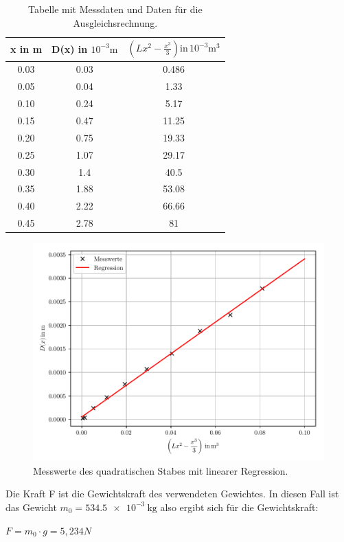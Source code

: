 \begin{table}
  \centering
  \caption{Tabelle mit Messdaten und Daten für die Ausgleichsrechnung.}
  \begin{tabular}{c c c}
    \toprule
    x in \si{\meter} & D(x) in $10^{-3}\si{\meter}$ & $\left(Lx^2-\frac{x^3}{3}\right) \text{in} \, 10^{-3}\si{\meter\tothe{3}}$ \\
    \midrule
    0.03 & 0.03 &  0.486 \\
    0.05 & 0.04 &  1.33 \\
    0.10 & 0.24 &  5.17 \\
    0.15 & 0.47 &  11.25 \\
    0.20 & 0.75 &  19.33 \\
    0.25 & 1.07 &  29.17 \\
    0.30 & 1.4 &  40.5 \\
    0.35 & 1.88 &  53.08 \\
    0.40 & 2.22 &  66.66 \\
    0.45 & 2.78 &  81 \\
    \bottomrule
  \end{tabular}
\end{table}

\begin{figure}[H]
  \centering
  \includegraphics[width=\textwidth]{ausgleichsgerade1.pdf}
  \caption{Messwerte des quadratischen Stabes mit linearer Regression.}
\end{figure}

Die Kraft F ist die Gewichtskraft des verwendeten Gewichtes. In diesen Fall ist das Gewicht
$m_0 = \SI{534.5e-3}{\kilo\gram}$ also ergibt sich für die Gewichtskraft:\\
\centerline{$F = m_0 \cdot g = 5,234 N$}

